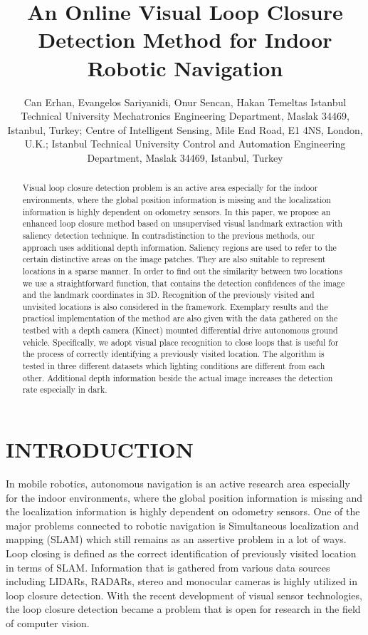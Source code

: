 \documentclass[]{spie}  %
\title{An Online Visual Loop Closure Detection Method for Indoor Robotic Navigation}
\author{
Can Erhan\supit{a}, 
Evangelos Sariyanidi\supit{b}, 
Onur Sencan\supit{c}, 
Hakan Temeltas\supit{c}
\skiplinehalf
\supit{a}Istanbul Technical University Mechatronics Engineering Department, Maslak 34469, Istanbul, Turkey; 
\supit{b}Centre of Intelligent Sensing, Mile End Road, E1 4NS, London, U.K.;
\supit{c}Istanbul Technical University Control and Automation Engineering Department, Maslak 34469, Istanbul, Turkey
}
\begin{document}
 
\maketitle 

\begin{abstract}
Visual loop closure detection problem is an active area especially for the indoor environments, where the global position information is missing and the localization information is highly dependent on odometry sensors. In this paper, we propose an enhanced loop closure method based on unsupervised visual landmark extraction with saliency detection technique. In contradistinction to the previous methods, our approach uses additional depth information. Saliency regions are used to refer to the certain distinctive areas on the image patches. They are also suitable to represent locations in a sparse manner.  In order to find out the similarity between two locations we use a straightforward function, that contains the detection confidences of the image and the landmark coordinates in 3D. Recognition of the previously visited and unvisited locations is also considered in the framework. Exemplary results and the practical implementation of the method are also given with the data gathered on the testbed with a depth camera (Kinect) mounted differential drive autonomous ground vehicle. Specifically, we adopt visual place recognition to close loops that is useful for the process of correctly identifying a previously visited location. The algorithm is tested in three different datasets which lighting conditions are different from each other. Additional depth information beside the actual image increases the detection rate especially in dark. 
\end{abstract}



\section{INTRODUCTION}

In mobile robotics, autonomous navigation is an active research area especially for the indoor environments, where the global position information is missing and the localization information is highly dependent on odometry sensors. One of the major problems connected to robotic navigation is Simultaneous localization and mapping (SLAM) which still remains as an assertive problem in a lot of ways. Loop closing is defined as the correct identification of previously visited location in terms of SLAM. Information that is gathered from various data sources including LIDARs, RADARs, stereo and monocular cameras\cite{williams08iros, 5650234} is highly utilized in loop closure detection. With the recent development of visual sensor technologies, the loop closure detection became a problem that is open for research in the field of computer vision.
\end{document}
